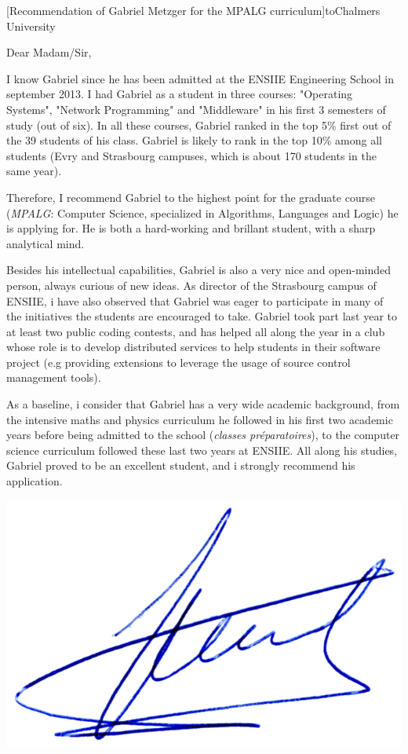 \documentclass[a4paper,10pt]{article}
\begin{document}

\begin{letter}[Recommendation of Gabriel Metzger for the MPALG curriculum]{to}{Chalmers University}

Dear Madam/Sir, 

I know Gabriel since he has been admitted at the ENSIIE Engineering School in september 2013.
%
I had Gabriel as a student in three courses: "Operating Systems",
 "Network Programming" and "Middleware" in his first 3 semesters 
of study (out of six). In all these courses, Gabriel ranked in the top 
5\% first out of the  39 students of his class.  Gabriel is likely to 
rank in the top 10\%  among all students (Evry and Strasbourg
campuses, which is about 170 students in the same year). 

Therefore, I recommend Gabriel to the highest point for the graduate 
course (\textit{MPALG}: Computer Science, specialized in Algorithms, Languages and Logic) 
he is applying for. He is both a hard-working and brillant student, with a 
sharp analytical mind. 

Besides his intellectual capabilities, Gabriel is also a
 very nice and  open-minded person, always curious of new ideas. 
As director  of the Strasbourg campus of ENSIIE, i have also observed that Gabriel
was eager to participate in many of the initiatives the students are encouraged
to take. Gabriel took part last year to at least two public coding contests, and 
has helped all along the year in a club whose role is to develop distributed
services to help students in their software project (e.g providing extensions to
leverage the usage of source control management tools).

As a baseline, i consider that Gabriel has a very wide academic background,
from the intensive maths and physics curriculum he followed in his first two
academic years before being admitted to the school (\emph{classes
  préparatoires}), to the computer science curriculum followed these last
two years at ENSIIE. All along his studies, Gabriel proved to be an excellent 
student, and i strongly  recommend his application.


\end{letter}
\begin{flushright}
\includegraphics[width=.26\textwidth]{signgenaud.jpg}
\end{flushright}
\end{document}
